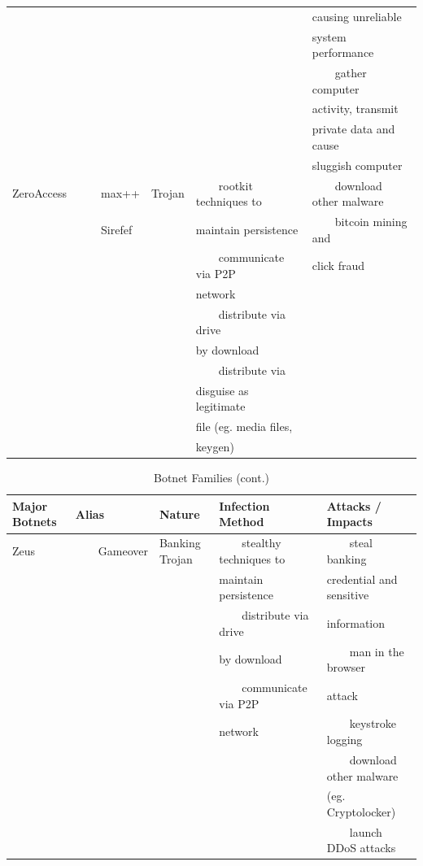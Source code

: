 \documentclass[12pt]{article}
\newcommand{\tabitem}{~~\llap{\textbullet}~~}
\begin{document}
\begin{table}[!htbp]
\begin{tabular}{lllll}
&&&&causing unreliable \\
&&&&system performance \\
&&&&\tabitem gather computer \\
&&&&activity, transmit \\
&&&&private data and cause \\
&&&&sluggish computer \\
ZeroAccess &\tabitem max++ &Trojan    &\tabitem rootkit techniques to &\tabitem download other malware \\
&\tabitem Sirefef   &&maintain persistence &\tabitem bitcoin mining and \\
&&&\tabitem communicate via P2P &click fraud   \\
&&&network &\\
&&&\tabitem distribute via drive &\\
&&&by download &\\
&&&\tabitem distribute via &\\
&&&disguise as legitimate &\\
&&&file (eg. media files, &\\
&&&keygen) &\\
\hline
\end{tabular}
\end{table}
\newpage\begin{table}[!htbp]
\centering
\caption{Botnet Families (cont.)}
\begin{tabular}{lllll} \hline
\bf Major Botnets & \bf Alias & \bf Nature & \bf Infection Method & \bf Attacks / Impacts\\\hline
Zeus &\tabitem Gameover     &Banking Trojan &\tabitem stealthy techniques to &\tabitem steal banking \\
&&    &maintain persistence &credential and sensitive \\
&&&\tabitem distribute via drive &information \\
&&&by download &\tabitem man in the browser \\
&&&\tabitem communicate via P2P &attack \\
&&&network   &\tabitem keystroke logging \\
&&&&\tabitem download other malware \\
&&&&(eg. Cryptolocker) \\
&&&&\tabitem launch DDoS attacks \\
\hline
\end{tabular}
\end{table}
\end{document}
